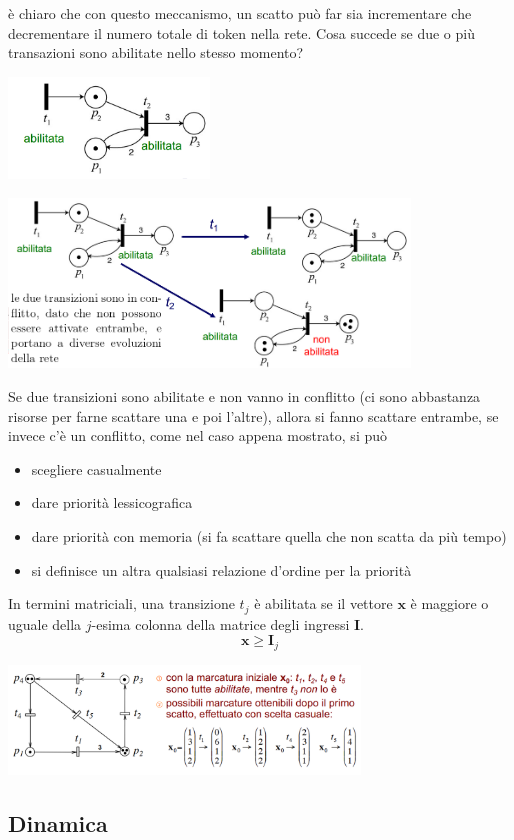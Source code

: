 \documentclass[10pt, letterpaper]{report}
\begin{document}
è chiaro che con questo meccanismo, un scatto può far sia incrementare che decrementare il numero totale di token nella rete.\acc 
Cosa succede se due o più transazioni sono abilitate nello stesso momento?
\begin{center}
    \includegraphics[width=0.4\textwidth]{images/dueAbilitate.png}
\end{center}
\begin{center}
    \includegraphics[width=0.8\textwidth]{images/scattaPetri3.png}
\end{center}
Se due transizioni sono abilitate e non vanno in conflitto (ci sono abbastanza risorse per farne scattare una e poi l'altre), allora si fanno scattare entrambe, se invece c'è un conflitto, come nel caso appena mostrato, si può \begin{itemize}
    \item scegliere casualmente 
    \item dare priorità lessicografica 
    \item dare priorità con memoria (si fa scattare quella che non scatta da più tempo)
    \item si definisce un altra qualsiasi relazione d'ordine per la priorità 
\end{itemize}
In termini matriciali, una transizione $t_j$ è abilitata se il vettore $\mathbf x$ è maggiore o uguale della $j$-esima colonna della matrice degli ingressi $\mathbf I$. $$ \mathbf x\ge \mathbf I_j$$\begin{center}
    \includegraphics[width=0.7\textwidth]{images/petri3.png}
\end{center}\subsection{Dinamica}
\end{document}

